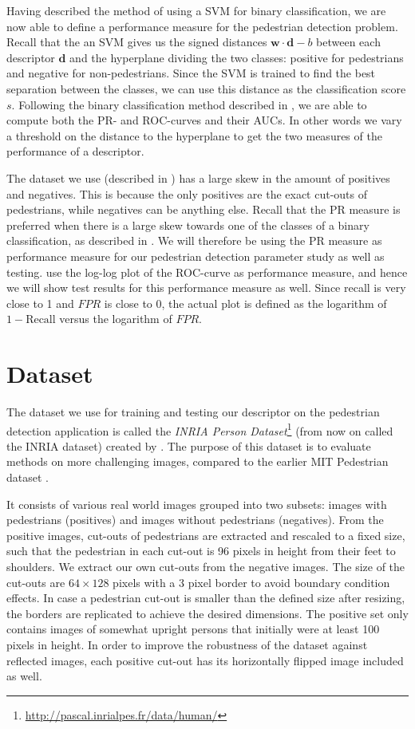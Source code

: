 \documentclass[thesis.tex]{subfiles}
\def\d{\mathbf{d}}
\def\w{\mathbf{w}}
\newcommand\FPR{\mathit{FPR}}
\begin{document}
Having described the method of using a SVM for binary classification, we are now able to define a performance measure for the pedestrian detection problem. Recall that the an SVM gives us the signed distances $\w \cdot \d - b$ between each descriptor $\d$ and the hyperplane dividing the two classes: positive for pedestrians and negative for non-pedestrians. Since the SVM is trained to find the best separation between the classes, we can use this distance as the classification score $s$. Following the binary classification method described in , we are able to compute both the PR- and ROC-curves and their AUCs. In other words we vary a threshold on the distance to the hyperplane to get the two measures of the performance of a descriptor.

The dataset we use (described in ) has a large skew in the amount of positives and negatives. This is because the only positives are the exact cut-outs of pedestrians, while negatives can be anything else.
Recall that the PR measure is preferred when there is a large skew towards one of the classes of a binary classification, as described in . We will therefore be using the PR measure as performance measure for our pedestrian detection parameter study as well as testing.  use the log-log plot of the ROC-curve as performance measure, and hence we will show test results for this performance measure as well. Since recall is very close to 1 and $\FPR$ is close to 0, the actual plot is defined as the logarithm of $1-\text{Recall}$ versus the logarithm of $\FPR$.
%
\section{Dataset}
\label{sec:odDataset}
%
The dataset we use for training and testing our descriptor on the pedestrian detection application is called the \emph{INRIA Person Dataset}\footnote{\url{http://pascal.inrialpes.fr/data/human/}} (from now on called the INRIA dataset) created by \citet{dalal2005histograms}. The purpose of this dataset is to evaluate methods on more challenging images, compared to the earlier MIT Pedestrian dataset \cite{papageorgiou2000trainable}.

It consists of various real world images grouped into two subsets: images with pedestrians (positives) and images without pedestrians (negatives). From the positive images, cut-outs of pedestrians are extracted and rescaled to a fixed size, such that the pedestrian in each cut-out is 96 pixels in height from their feet to shoulders. We extract our own cut-outs from the negative images. The size of the cut-outs are $64 \times 128$ pixels with a 3 pixel border to avoid boundary condition effects. In case a pedestrian cut-out is smaller than the defined size after resizing, the borders are replicated to achieve the desired dimensions.
The positive set only contains images of somewhat upright persons that initially were at least 100 pixels in height. In order to improve the robustness of the dataset against reflected images, each positive cut-out has its horizontally flipped image included as well.
\end{document}
